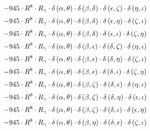 \begin{subequations}
\begin{gather}
 \\[0.2em] \notag 		 - 945 \cdot R^{8} \cdot R_{\gamma{}} \cdot \delta{}\left(\alpha{}, \theta{}\right) \cdot \delta{}\left(\beta{}, \delta{}\right) \cdot \delta{}\left(\epsilon{}, \zeta{}\right) \cdot \delta{}\left(\eta{}, \iota{}\right) 
 \\[0.2em] \notag 		 - 945 \cdot R^{8} \cdot R_{\gamma{}} \cdot \delta{}\left(\alpha{}, \theta{}\right) \cdot \delta{}\left(\beta{}, \delta{}\right) \cdot \delta{}\left(\epsilon{}, \eta{}\right) \cdot \delta{}\left(\zeta{}, \iota{}\right) 
 \\[0.2em] \notag 		 - 945 \cdot R^{8} \cdot R_{\gamma{}} \cdot \delta{}\left(\alpha{}, \theta{}\right) \cdot \delta{}\left(\beta{}, \delta{}\right) \cdot \delta{}\left(\epsilon{}, \iota{}\right) \cdot \delta{}\left(\zeta{}, \eta{}\right) 
 \\[0.2em] \notag 		 - 945 \cdot R^{8} \cdot R_{\gamma{}} \cdot \delta{}\left(\alpha{}, \theta{}\right) \cdot \delta{}\left(\beta{}, \epsilon{}\right) \cdot \delta{}\left(\delta{}, \zeta{}\right) \cdot \delta{}\left(\eta{}, \iota{}\right) 
 \\[0.2em] \notag 		 - 945 \cdot R^{8} \cdot R_{\gamma{}} \cdot \delta{}\left(\alpha{}, \theta{}\right) \cdot \delta{}\left(\beta{}, \epsilon{}\right) \cdot \delta{}\left(\delta{}, \eta{}\right) \cdot \delta{}\left(\zeta{}, \iota{}\right) 
 \\[0.2em] \notag 		 - 945 \cdot R^{8} \cdot R_{\gamma{}} \cdot \delta{}\left(\alpha{}, \theta{}\right) \cdot \delta{}\left(\beta{}, \epsilon{}\right) \cdot \delta{}\left(\delta{}, \iota{}\right) \cdot \delta{}\left(\zeta{}, \eta{}\right) 
 \\[0.2em] \notag 		 - 945 \cdot R^{8} \cdot R_{\gamma{}} \cdot \delta{}\left(\alpha{}, \theta{}\right) \cdot \delta{}\left(\beta{}, \zeta{}\right) \cdot \delta{}\left(\delta{}, \epsilon{}\right) \cdot \delta{}\left(\eta{}, \iota{}\right) 
 \\[0.2em] \notag 		 - 945 \cdot R^{8} \cdot R_{\gamma{}} \cdot \delta{}\left(\alpha{}, \theta{}\right) \cdot \delta{}\left(\beta{}, \zeta{}\right) \cdot \delta{}\left(\delta{}, \eta{}\right) \cdot \delta{}\left(\epsilon{}, \iota{}\right) 
 \\[0.2em] \notag 		 - 945 \cdot R^{8} \cdot R_{\gamma{}} \cdot \delta{}\left(\alpha{}, \theta{}\right) \cdot \delta{}\left(\beta{}, \zeta{}\right) \cdot \delta{}\left(\delta{}, \iota{}\right) \cdot \delta{}\left(\epsilon{}, \eta{}\right) 
 \\[0.2em] \notag 		 - 945 \cdot R^{8} \cdot R_{\gamma{}} \cdot \delta{}\left(\alpha{}, \theta{}\right) \cdot \delta{}\left(\beta{}, \eta{}\right) \cdot \delta{}\left(\delta{}, \epsilon{}\right) \cdot \delta{}\left(\zeta{}, \iota{}\right) 

\end{gather}
\end{subequations}
